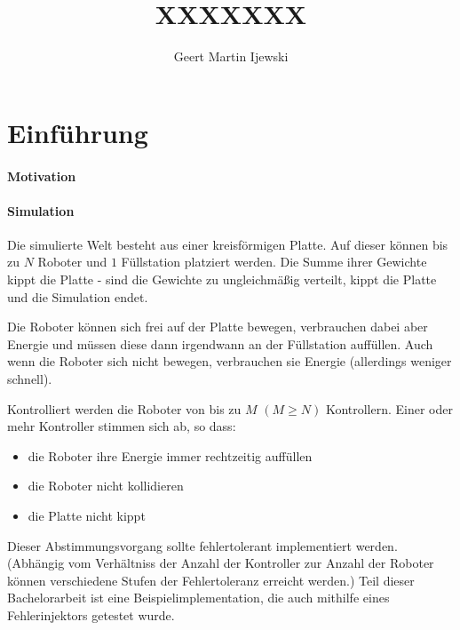 ﻿\documentclass[
    12pt,
    bibliography=totoc,
    ngerman
]{scrartcl}
\title{XXXXXXX}
\author{Geert Martin Ijewski}
\begin{document}
\maketitle
\thispagestyle{empty}

\clearpage
\tableofcontents
\listoffigures
\listoftables

\clearpage
\section{Einf{\"{u}}hrung}

\paragraph{Motivation} 

\paragraph{Simulation} Die simulierte Welt besteht aus einer kreisf{\"{o}}rmigen Platte. Auf dieser k{\"{o}}nnen bis zu $N$ Roboter und $1$ F{\"{u}}llstation
platziert werden. Die Summe ihrer Gewichte kippt die Platte - sind die Gewichte zu ungleichm{\"{a}}{\ss}ig verteilt, kippt
die Platte und die Simulation endet.

Die Roboter k{\"{o}}nnen sich frei auf der Platte bewegen, verbrauchen dabei aber Energie und m{\"{u}}ssen diese dann irgendwann
an der F{\"{u}}llstation auff{\"{u}}llen. Auch wenn die Roboter sich nicht bewegen, verbrauchen sie Energie (allerdings weniger
schnell).

Kontrolliert werden die Roboter von bis zu $M$ $(M \geq N)$ Kontrollern. Einer oder mehr Kontroller stimmen sich ab,
so dass:
\begin{itemize}
\item die Roboter ihre Energie immer rechtzeitig auff{\"{u}}llen
\item die Roboter nicht kollidieren
\item die Platte nicht kippt
\end{itemize}

Dieser Abstimmungsvorgang sollte fehlertolerant implementiert werden. (Abh{\"{a}}ngig vom Verh{\"{a}}ltniss der Anzahl der Kontroller zur
Anzahl der Roboter k{\"{o}}nnen verschiedene Stufen der Fehlertoleranz erreicht werden.\cite[s.149]{Werner00}) Teil dieser Bachelorarbeit ist eine
Beispielimplementation, die auch mithilfe eines Fehlerinjektors getestet wurde.
\end{document}
